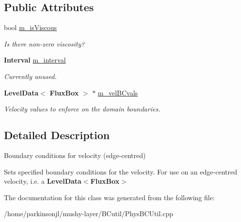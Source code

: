 \subsection*{Public Attributes}
\begin{DoxyCompactItemize}
\item 
\mbox{\label{class_basic_e_c_vel_b_c_function_aa1522389e5ac482263af7757e8a381e6}} 
bool \hyperlink{class_basic_e_c_vel_b_c_function_aa1522389e5ac482263af7757e8a381e6}{m\+\_\+is\+Viscous}
\begin{DoxyCompactList}\small\item\em Is there non-\/zero viscosity? \end{DoxyCompactList}\item 
\mbox{\label{class_basic_e_c_vel_b_c_function_aed09a1041c4354b17080f48ea887caa9}} 
\textbf{ Interval} \hyperlink{class_basic_e_c_vel_b_c_function_aed09a1041c4354b17080f48ea887caa9}{m\+\_\+interval}
\begin{DoxyCompactList}\small\item\em Currently unused. \end{DoxyCompactList}\item 
\mbox{\label{class_basic_e_c_vel_b_c_function_a6a7b054339623b6190a97b64d629a330}} 
\textbf{ Level\+Data}$<$ \textbf{ Flux\+Box} $>$ $\ast$ \hyperlink{class_basic_e_c_vel_b_c_function_a6a7b054339623b6190a97b64d629a330}{m\+\_\+vel\+B\+Cvals}
\begin{DoxyCompactList}\small\item\em Velocity values to enforce on the domain boundaries. \end{DoxyCompactList}\end{DoxyCompactItemize}


\subsection{Detailed Description}
Boundary conditions for velocity (edge-\/centred) 

Sets specified boundary conditions for the velocity. For use on an edge-\/centred velocity, i.\+e. a \textbf{ Level\+Data$<$\+Flux\+Box$>$} 

The documentation for this class was generated from the following file\+:\begin{DoxyCompactItemize}
\item 
/home/parkinsonjl/mushy-\/layer/\+B\+Cutil/Phys\+B\+C\+Util.\+cpp\end{DoxyCompactItemize}
